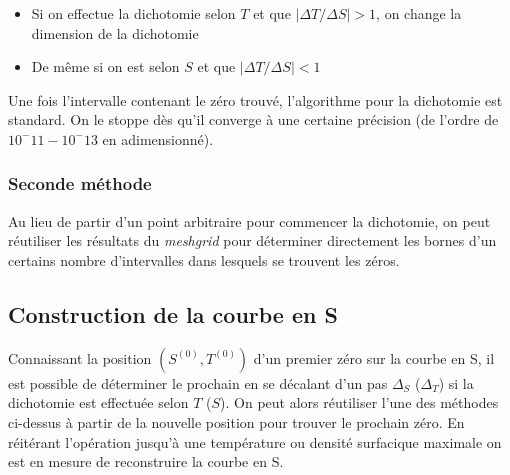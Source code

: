 \documentclass[a4paper,11pt]{article}
\begin{document}
        \begin{itemize}
            \item Si on effectue la dichotomie selon $T$ et que $\left | \Delta T / \Delta S \right | > 1$, on change la dimension de la dichotomie
            \item De même si on est selon $S$ et que $\left | \Delta T / \Delta S \right | < 1$
        \end{itemize}
    
        Une fois l'intervalle contenant le zéro trouvé, l'algorithme pour la dichotomie  est standard. On le stoppe dès qu'il converge à une certaine précision (de l'ordre de $10^-11 - 10^-13$ en adimensionné).
        
        \subsubsection{Seconde méthode}
            Au lieu de partir d'un point arbitraire pour commencer la dichotomie, on peut réutiliser les résultats du \textit{meshgrid} pour déterminer directement les bornes d'un certains nombre d'intervalles dans lesquels se trouvent les zéros.
        
    \subsection{Construction de la courbe en S}
        Connaissant la position $(S^{(0)} , T^{(0)})$ d'un premier zéro sur la courbe en S, il est possible de déterminer le prochain en se décalant d'un pas $\Delta_S$ ($\Delta_T$) si la dichotomie est effectuée selon $T$ ($S$).\newline
        On peut alors réutiliser l'une des méthodes ci-dessus à partir de la nouvelle position pour trouver le prochain zéro.
        En réitérant l'opération jusqu'à une température ou densité surfacique maximale on est en mesure de reconstruire la courbe en S.
    
    
    
    
    
    
    
    
    
    
    
    
    
    
    
    
    
    
    
\end{document}
